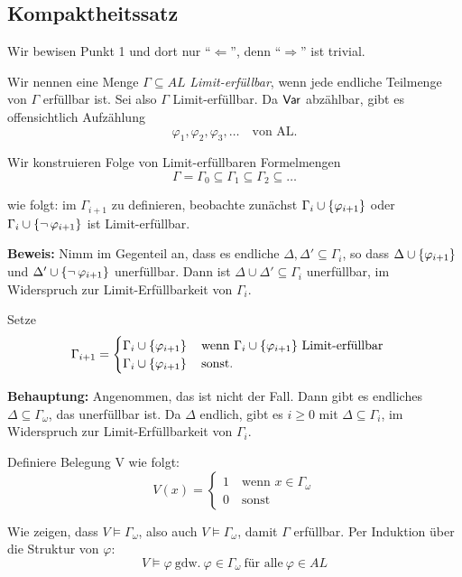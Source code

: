\subsection{Kompaktheitssatz}

Wir bewisen Punkt 1 und dort nur \enquote{$\Leftarrow$}, denn \enquote{$\Rightarrow$} ist trivial.

Wir nennen eine Menge $\Gamma\subseteq AL$ \textit{Limit-erfüllbar}, wenn jede
endliche Teilmenge von $\Gamma$ erfüllbar ist. Sei also $\Gamma$ Limit-erfüllbar.
Da $\operatorname{\text{\textsf{Var}}}$ abzählbar, gibt es offensichtlich Aufzählung
\[
  \varphi_1,\varphi_2,\varphi_3,\dots \quad\text{von AL.}
\]

Wir konstruieren Folge von Limit-erfüllbaren Formelmengen
\[
  \Gamma = \Gamma_0 \subseteq \Gamma_1 \subseteq \Gamma_2 \subseteq \dots
\]

wie folgt: im $\Gamma_{i+1}$ zu definieren, beobachte zunächst
$\Gamma_i\cup\left\{\varphi_{i+1}\right\}$ oder $\Gamma_i\cup\left\{\operatorname{\neg}\varphi_{i+1}\right\}$
ist Limit-erfüllbar.

\textbf{Beweis:} Nimm im Gegenteil an, dass es endliche
$\Delta,\Delta'\subseteq\Gamma_i$, so dass $\Delta\cup\left\{\varphi_{i+1}\right\}$ und
$\Delta'\cup\left\{\operatorname{\neg}\varphi_{i+1}\right\}$ unerfüllbar. Dann ist
$\Delta\cup\Delta'\subseteq\Gamma_i$ unerfüllbar, im Widerspruch zur
Limit-Erfüllbarkeit von $\Gamma_i$.

Setze
\[
  \Gamma_{i+1} = \begin{cases}
    \Gamma_i \cup \left\{\varphi_{i+1}\right\} \quad\text{wenn $\Gamma_i\cup\left\{\varphi_{i+1}\right\}$ Limit-erfüllbar} \\
    \Gamma_i \cup \left\{\varphi_{i+1}\right\} \quad\text{sonst.} \\
  \end{cases}
\]

\textbf{Behauptung:} Angenommen, das ist nicht der Fall. Dann gibt es endliches
$\Delta\subseteq\Gamma_\omega$, das unerfüllbar ist. Da $\Delta$ endlich, gibt
es $i\geq 0$ mit $\Delta\subseteq\Gamma_i$, im Widerspruch zur
Limit-Erfüllbarkeit von $\Gamma_i$.

Definiere Belegung V wie folgt:
\[
  V(x) = \begin{cases}
    1 \quad\text{wenn $x \in \Gamma_\omega$}\\
    0 \quad\text{sonst}
  \end{cases}
\]

Wie zeigen, dass $V\models\Gamma_\omega$, also auch $V\models\Gamma_\omega$, damit $\Gamma$ erfüllbar.
Per Induktion über die Struktur von $\varphi$:
\[
  V \models \varphi\ \text{gdw.}\ \varphi \in \Gamma_\omega\ \text{für alle}\ \varphi \in AL
\]

